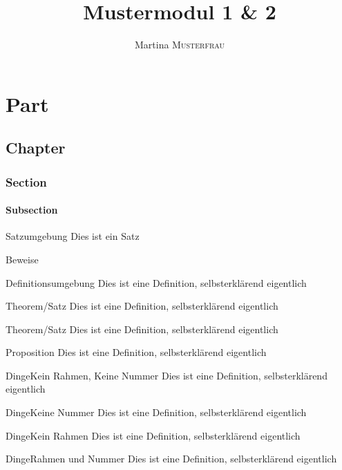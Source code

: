 \documentclass[red, ngerman]{skript}
\author{Martina \textsc{Musterfrau}}
\title{Mustermodul 1 \& 2 \\\subtitleformat{Skript zum Mustermodul Dinge Bla}}
\begin{document}
\maketitle

\tableofcontents

\part{Part}
\chapter{Chapter}
\section{Section}
\subsection{Subsection}
\begin{satz}{Satzumgebung}
	Dies ist ein Satz
\end{satz}
\clearpage
\begin{beweis}
	Beweise
\end{beweis}

\begin{definition}{Definitionsumgebung}
	Dies ist eine Definition, selbsterklärend eigentlich
\end{definition}
\begin{satz}{Theorem/Satz}
	Dies ist eine Definition, selbsterklärend eigentlich
\end{satz}
\begin{theorem}{Theorem/Satz}
	Dies ist eine Definition, selbsterklärend eigentlich
\end{theorem}
\begin{proposition}{Proposition}
	Dies ist eine Definition, selbsterklärend eigentlich
\end{proposition}

\begin{eBox}{Dinge}{Kein Rahmen, Keine Nummer}
	Dies ist eine Definition, selbsterklärend eigentlich
\end{eBox}
\begin{bBox}{Dinge}{Keine Nummer}
	Dies ist eine Definition, selbsterklärend eigentlich
\end{bBox}
\begin{nBox}{Dinge}{Kein Rahmen}
	Dies ist eine Definition, selbsterklärend eigentlich
\end{nBox}
\begin{bnBox}{Dinge}{Rahmen und Nummer}
	Dies ist eine Definition, selbsterklärend eigentlich
\end{bnBox}
\end{document}
